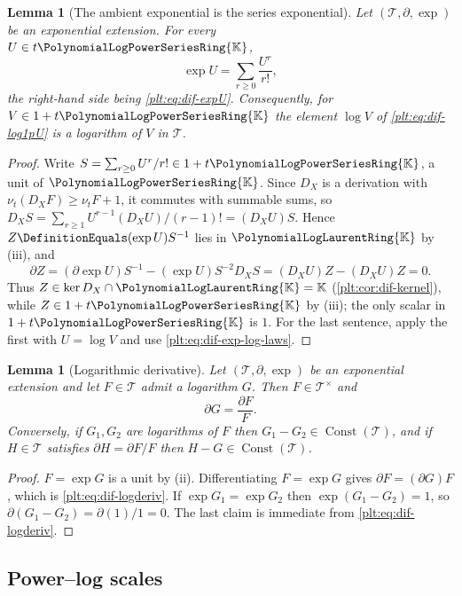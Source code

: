 \documentclass[11pt,oneside]{article}
\theoremstyle{plain}
\newtheorem{lemma}[theorem]{Lemma}
\theoremstyle{definition}
\theoremstyle{remark}
\newcommand{\K}{\mathbb{K}}
\newcommand{\PLpow}{\PolynomialLogPowerSeriesRing{\K}}   %
\newcommand{\PLlau}{\PolynomialLogLaurentRing{\K}}       %
\newcommand{\ordt}{\nu_{t}}                              %
\newcommand{\DX}{D_{X}}                                  %
\begin{document}
\begin{lemma}[The ambient exponential is the series exponential]
\label{plt:lem:dif-series-exp}
Let \((\mathcal T,\partial,\exp)\) be an exponential extension.  For every
\(U\in t\PLpow\),
\[
  \exp U=\sum_{r\ge0}\frac{U^{r}}{r!},
\]
the right-hand side being \cref{plt:eq:dif-expU}.  Consequently, for
\(V\in1+t\PLpow\) the element \(\log V\) of \cref{plt:eq:dif-log1pU} is a
logarithm of \(V\) in \(\mathcal T\).
\end{lemma}

\begin{proof}
Write \(S=\sum_{r\ge0}U^{r}/r!\in1+t\PLpow\), a unit of \(\PLpow\).  Since
\(\DX\) is a derivation with \(\ordt(\DX F)\ge\ordt F+1\), it commutes with
summable sums, so \(\DX S=\sum_{r\ge1}U^{r-1}(\DX U)/(r-1)!=(\DX U)S\).  Hence
\(Z\DefinitionEquals(\exp U)S^{-1}\) lies in \(\PLlau\) by (iii), and
\[
  \partial Z=(\partial\exp U)S^{-1}-(\exp U)S^{-2}\DX S
  =(\DX U)Z-(\DX U)Z=0 .
\]
Thus \(Z\in\ker\DX\cap\PLlau=\K\) (\cref{plt:cor:dif-kernel}), while
\(Z\in1+t\PLpow\) by (iii); the only scalar in \(1+t\PLpow\) is \(1\).  For the
last sentence, apply the first with \(U=\log V\) and use
\cref{plt:eq:dif-exp-log-laws}.
\end{proof}

\begin{lemma}[Logarithmic derivative]\label{plt:lem:dif-logderiv}
Let \((\mathcal T,\partial,\exp)\) be an exponential extension and let
\(F\in\mathcal T\) admit a logarithm \(G\).  Then \(F\in\mathcal T^{\times}\)
and
\begin{equation}\label{plt:eq:dif-logderiv}
  \partial G=\frac{\partial F}{F}.
\end{equation}
Conversely, if \(G_{1},G_{2}\) are logarithms of \(F\) then
\(G_{1}-G_{2}\in\operatorname{Const}(\mathcal T)\), and if \(H\in\mathcal T\)
satisfies \(\partial H=\partial F/F\) then \(H-G\in\operatorname{Const}
(\mathcal T)\).
\end{lemma}

\begin{proof}
\(F=\exp G\) is a unit by (ii).  Differentiating \(F=\exp G\) gives
\(\partial F=(\partial G)F\), which is \cref{plt:eq:dif-logderiv}.  If
\(\exp G_{1}=\exp G_{2}\) then \(\exp(G_{1}-G_{2})=1\), so
\(\partial(G_{1}-G_{2})=\partial(1)/1=0\).  The last claim is immediate from
\cref{plt:eq:dif-logderiv}.
\end{proof}

\subsection{Power--log scales}
\label{plt:sec:dif-scales}
\end{document}

